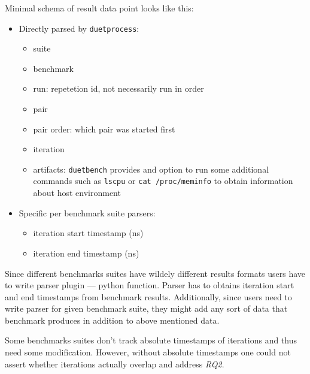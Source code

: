 Minimal schema of result data point looks like this:
\begin{itemize}
    \item Directly parsed by \lstinline{duetprocess}:
        \begin{itemize}
            \item suite
            \item benchmark
            \item run: repetetion id, not necessarily run in order
            \item pair
            \item pair order: which pair was started first
            \item iteration
            \item artifacts: \lstinline{duetbench} provides and option to run some additional commands such as \lstinline{lscpu} or \lstinline{cat /proc/meminfo} to obtain information about host environment
        \end{itemize}
    \item Specific per benchmark suite parsers:
        \begin{itemize}
            \item iteration start timestamp (ns)
            \item iteration end timestamp (ns)
        \end{itemize}
\end{itemize}

Since different benchmarks suites have wildely different results formats users have to write parser plugin --- python function.
Parser has to obtains iteration start and end timestamps from benchmark results. 
Additionally, since users need to write parser for given benchmark suite, they might add any sort of data that benchmark produces in addition to above mentioned data.

Some benchmarks suites don't track absolute timestamps of iterations and thus need some modification.
However, without absolute timestamps one could not assert whether iterations actually overlap and address \emph{RQ2}.

